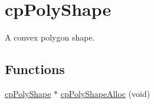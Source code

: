 \hypertarget{group__cp_poly_shape}{}\section{cp\+Poly\+Shape}
\label{group__cp_poly_shape}


A convex polygon shape.  


\subsection*{Functions}
\begin{DoxyCompactItemize}
\item 
\hypertarget{group__cp_poly_shape_ga3c45ef999add9db8c9d7115ace013b3e}{}\hyperlink{structcp_poly_shape}{cp\+Poly\+Shape} $\ast$ \hyperlink{group__cp_poly_shape_ga3c45ef999add9db8c9d7115ace013b3e}{cp\+Poly\+Shape\+Alloc} (void)\label{group__cp_poly_shape_ga3c45ef999add9db8c9d7115ace013b3e}


\end{DoxyCompactItemize}
